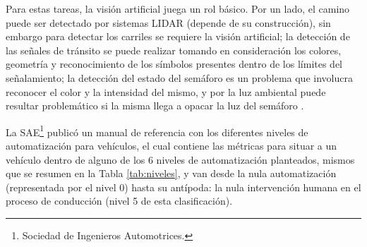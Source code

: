 \par Para estas tareas, la visión artificial juega un rol básico. Por un lado, el camino puede ser detectado por sistemas LIDAR (depende de su construcción), sin embargo para detectar los carriles se requiere la visión artificial; la detección de las señales de tránsito se puede realizar tomando en consideración los colores, geometría y reconocimiento de los símbolos presentes dentro de los límites del señalamiento; la detección del estado del semáforo es un problema que involucra reconocer el color y la intensidad del mismo, y por la luz ambiental puede resultar problemático si la misma llega a opacar la luz del semáforo \cite{broggiIntelligentVehicles2008}.
\par La SAE\footnote{Sociedad de Ingenieros Automotrices.} publicó un manual de referencia con los diferentes niveles de automatización \cite{saeTaxonomyDefinitiosTerms2014} para vehículos, el cual contiene las métricas para situar a un vehículo dentro de alguno de los 6 niveles de automatización planteados, mismos que se resumen en la Tabla \ref{tab:niveles}, y van desde la nula automatización (representada por el nivel 0) hasta su antípoda: la nula intervención humana en el proceso de conducción (nivel 5 de esta clasificación).

